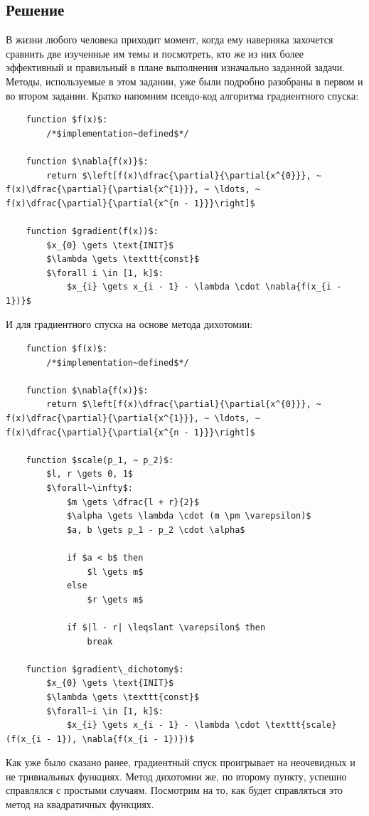 \documentclass[12pt, a4paper, oneside, final]{article}
\begin{document}
	\subsection*{Решение}
	В жизни любого человека приходит момент, когда ему наверняка захочется сравнить две изученные им темы и посмотреть, кто же из них более эффективный и правильный в плане выполнения изначально заданной задачи. Методы, используемые в этом задании, уже были подробно разобраны в первом и во втором задании. Кратко напомним псевдо-код алгоритма градиентного спуска:
	\begin{lstlisting}
	function $f(x)$:
		/*$implementation~defined$*/

	function $\nabla{f(x)}$:
		return $\left[f(x)\dfrac{\partial}{\partial{x^{0}}}, ~ f(x)\dfrac{\partial}{\partial{x^{1}}}, ~ \ldots, ~ f(x)\dfrac{\partial}{\partial{x^{n - 1}}}\right]$

	function $gradient(f(x))$:
		$x_{0} \gets \text{INIT}$
		$\lambda \gets \texttt{const}$
		$\forall i \in [1, k]$:
		    $x_{i} \gets x_{i - 1} - \lambda \cdot \nabla{f(x_{i - 1})}$
	\end{lstlisting}
	И для градиентного спуска на основе метода дихотомии:
	\begin{lstlisting}
	function $f(x)$:
		/*$implementation~defined$*/

	function $\nabla{f(x)}$:
		return $\left[f(x)\dfrac{\partial}{\partial{x^{0}}}, ~ f(x)\dfrac{\partial}{\partial{x^{1}}}, ~ \ldots, ~ f(x)\dfrac{\partial}{\partial{x^{n - 1}}}\right]$

	function $scale(p_1, ~ p_2)$:
		$l, r \gets 0, 1$
		$\forall~\infty$:
			$m \gets \dfrac{l + r}{2}$
			$\alpha \gets \lambda \cdot (m \pm \varepsilon)$
			$a, b \gets p_1 - p_2 \cdot \alpha$

			if $a < b$ then
				$l \gets m$
			else
				$r \gets m$

			if $|l - r| \leqslant \varepsilon$ then
				break

	function $gradient\_dichotomy$:
		$x_{0} \gets \text{INIT}$
		$\lambda \gets \texttt{const}$
		$\forall~i \in [1, k]$:
			$x_{i} \gets x_{i - 1} - \lambda \cdot \texttt{scale}(f(x_{i - 1}), \nabla{f(x_{i - 1})})$
	\end{lstlisting}
	Как уже было сказано ранее, градиентный спуск проигрывает на неочевидных и не тривиальных функциях. Метод дихотомии же, по второму пункту, успешно справлялся с простыми случаям. Посмотрим на то, как будет справляться это метод на квадратичных функциях.
\end{document}
